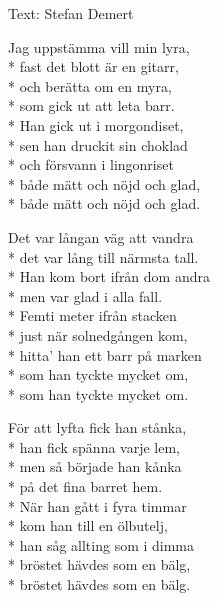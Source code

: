 \begin{SongText}
    \begin{SongInfo}
        Text: Stefan Demert
    \end{SongInfo}
    \begin{SongVerse}
        Jag uppstämma vill min lyra,\\*%
        fast det blott är en gitarr,\\*%
        och berätta om en myra,\\*%
        som gick ut att leta barr.\\*%
        Han gick ut i morgondiset,\\*%
        sen han druckit sin choklad\\*%
        och försvann i lingonriset\\*%
        både mätt och nöjd och glad,\\*%
        både mätt och nöjd och glad.
    \end{SongVerse}
    \begin{SongVerse}
        Det var långan väg att vandra\\*%
        det var lång till närmsta tall.\\*%
        Han kom bort ifrån dom andra\\*%
        men var glad i alla fall.\\*%
        Femti meter ifrån stacken\\*%
        just när solnedgången kom,\\*%
        hitta' han ett barr på marken\\*%
        som han tyckte mycket om,\\*%
        som han tyckte mycket om.
    \end{SongVerse}
    \begin{SongVerse}
        För att lyfta fick han stånka,\\*%
        han fick spänna varje lem,\\*%
        men så började han kånka\\*%
        på det fina barret hem.\\*%
        När han gått i fyra timmar\\*%
        kom han till en ölbutelj,\\*%
        han såg allting som i dimma\\*%
        bröstet hävdes som en bälg,\\*%
        bröstet hävdes som en bälg.
    \end{SongVerse}

\end{SongText}
